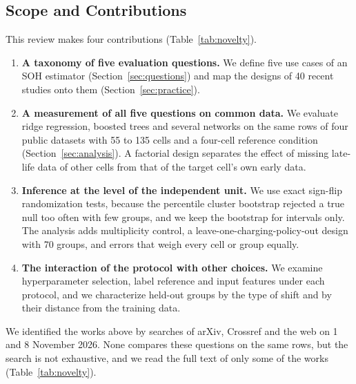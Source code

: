 \documentclass{ieeeaccess}
\begin{document}
\subsection{Scope and Contributions}
This review makes four contributions (Table~\ref{tab:novelty}).
\begin{enumerate}
\item \textbf{A taxonomy of five evaluation questions.} We define five use cases of an SOH estimator (Section~\ref{sec:questions}) and map the designs of 40 recent studies onto them (Section~\ref{sec:practice}).
\item \textbf{A measurement of all five questions on common data.} We evaluate ridge regression, boosted trees and several networks on the same rows of four public datasets with 55 to 135 cells and a four-cell reference condition (Section~\ref{sec:analysis}). A factorial design separates the effect of missing late-life data of other cells from that of the target cell's own early data.
\item \textbf{Inference at the level of the independent unit.} We use exact sign-flip randomization tests, because the percentile cluster bootstrap rejected a true null too often with few groups, and we keep the bootstrap for intervals only. The analysis adds multiplicity control, a leave-one-charging-policy-out design with 70 groups, and errors that weigh every cell or group equally.
\item \textbf{The interaction of the protocol with other choices.} We examine hyperparameter selection, label reference and input features under each protocol, and we characterize held-out groups by the type of shift and by their distance from the training data.
\end{enumerate}
We identified the works above by searches of arXiv, Crossref and the web on 1 and 8 November 2026. None compares these questions on the same rows, but the search is not exhaustive, and we read the full text of only some of the works (Table~\ref{tab:novelty}).
\end{document}

